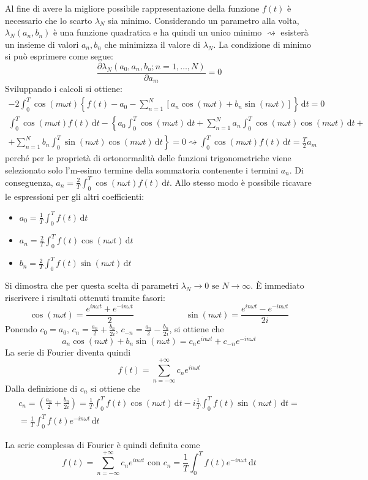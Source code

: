 Al fine di avere la migliore possibile rappresentazione della funzione \(f(t)\) è necessario che lo scarto \(\lambda _N\) sia minimo. Considerando un parametro alla volta, \(\lambda _N(a_n, b_n)\) è una funzione quadratica e ha quindi un unico minimo \(\rightsquigarrow \) esisterà un insieme di valori \(a_n, b_n\) che minimizza il valore di \(\lambda _N\). La condizione di minimo si può esprimere come segue:
\[
	\frac{\partial \lambda _N (a_0, a_n,b_n;n=1,\dots ,N)}{\partial a_m}=0 
\]
Sviluppando i calcoli si ottiene:
\begin{gather*}
	-2\int_{0}^{T} \cos (m \omega t) \left\{ f(t) - a_{0} - \sum_{n=1}^{N}[a_n \cos (n \omega t) + b_n \sin (n \omega t)]   \right\} \,\mathrm{d}t = 0\\
	\int_{0}^{T} \cos (m \omega t) f(t) \,\mathrm{d}t - \left\{a_0 \int_{0}^{T} \cos (m \omega t) \,\mathrm{d}t + \sum_{n=1}^{N} a_n \int_{0}^{T} \cos (n \omega t) \cos (m \omega t) \,\mathrm{d}t +\right.\\
	+ \left. \sum_{n=1}^{N} b_n \int_{0}^{T} \sin (n \omega t) \cos (m \omega t) \,\mathrm{d}t\right\} = 0
	\rightsquigarrow \int_{0}^{T} \cos (m \omega t) f(t) \,\mathrm{d}t = \frac{T}{2}a_m
\end{gather*}
perché per le proprietà di ortonormalità delle funzioni trigonometriche viene selezionato solo l'm-esimo termine della sommatoria contenente i termini \(a_n\).
Di conseguenza, \(a_n = \frac{2}{T} \int_{0}^{T} \cos (n \omega t) f(t) \,\mathrm{d}t \). Allo stesso modo è possibile ricavare le espressioni per gli altri coefficienti:
\begin{itemize}
	
	\item \(a_0 = \frac{1}{T} \int_{0}^{T} f(t) \,\mathrm{d}t \)
	\item \(a_n = \frac{2}{T} \int_{0}^{T} f(t) \cos (n \omega t) \,\mathrm{d}t \)
	\item \(b_n = \frac{2}{T} \int_{0}^{T} f(t) \sin (n \omega t) \,\mathrm{d}t \)   
\end{itemize}
Si dimostra che per questa scelta di parametri \(\lambda _N \to 0 \text{ se } N \to \infty \).
È immediato riscrivere i risultati ottenuti tramite fasori:
\[
	\cos (n \omega t) = \frac{e^{in \omega t} + e^{-in \omega t} }{2}
	\hspace{1in}
	\sin (n \omega t) = \frac{e^{in \omega t} - e^{-in \omega t}  }{2i}
\]
Ponendo \(c_0 = a_0 \text{, } c_n = \frac{a_n}{2} + \frac{b_n}{2i} \text{, } c_{-n} = \frac{a_n}{2} - \frac{b_n}{2i}  \), si ottiene che
\[
	a_n \cos (n \omega t) + b_n \sin (n \omega t) = c_n e^{in \omega t} + c_{-n} e^{-in \omega t}
\]
La serie di Fourier diventa quindi
\[
	f(t) = \sum_{n=-\infty}^{+\infty} c_n e^{in \omega t}
\]
Dalla definizione di \(c_n\) si ottiene che
\begin{gather*}
	c_n = \left(\frac{a_n}{2}+\frac{b_n}{2i}\right) = \frac{1}{T} \int_{0}^{T} f(t) \cos (n \omega t) \,\mathrm{d}t - i \frac{1}{T} \int_{0}^{T} f(t) \sin (n \omega t) \,\mathrm{d}t =\\
	= \frac{1}{T} \int_{0}^{T} f(t) e^{-in \omega t} \,\mathrm{d}t 
\end{gather*}

\begin{definition}
	La serie complessa di Fourier è quindi definita come 
	\[
		f(t) = \sum_{n=-\infty}^{+\infty} c_n e^{in \omega t} \text{ con } c_n = \frac{1}{T} \int_{0}^{T} f(t) e^{-in \omega t} \,\mathrm{d}t 
	\]
\end{definition}